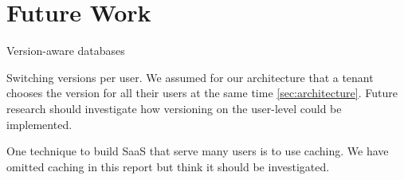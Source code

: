 \section{Future Work}

Version-aware databases

Switching versions per user. We assumed for our architecture that a tenant chooses the version for all their users at the same time \ref{sec:architecture}. Future research should investigate how versioning on the user-level could be implemented.

One technique to build SaaS that serve many users is to use caching. We have omitted caching in this report but think it should be investigated.